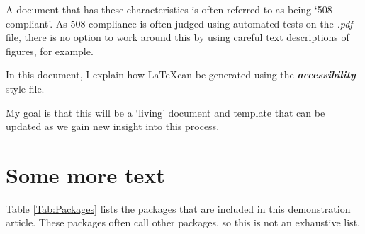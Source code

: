 \documentclass[10pt,twocolumn]{article}
\newcommand{\fn}[1]{\emph{#1}}
\newcommand{\packagename}[1]{\textbf{\emph{#1}}}
\begin{document}
A document that has these characteristics is often referred to as being `508 compliant'. As 508-compliance is often judged using automated tests on the \fn{.pdf} file, there is no option to work around this by using careful text descriptions of figures, for example.

In this document, I explain how \LaTeX can be generated using the \packagename{accessibility} style file.

My goal is that this will be a `living' document and template that can be updated as we gain new insight into this process.

\section{Some more text}

Table \ref{Tab:Packages} lists the packages that are included in this demonstration article. These packages often call other packages, so this is not an exhaustive list.
\end{document}
